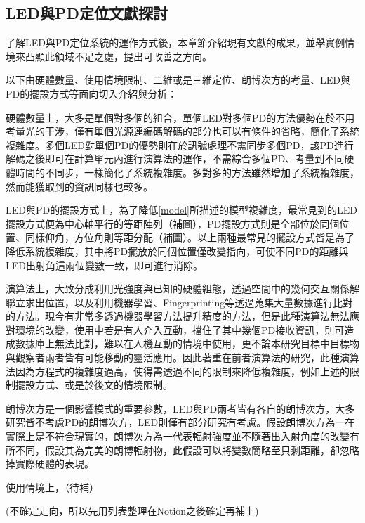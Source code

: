     \subsection{LED與PD定位文獻探討}

        了解LED與PD定位系統的運作方式後，本章節介紹現有文獻的成果，並舉實例情境來凸顯此領域不足之處，提出可改善之方向。

        以下由硬體數量、使用情境限制、二維或是三維定位、朗博次方的考量、LED與PD的擺設方式等面向切入介紹與分析：

        硬體數量上，大多是單個對多個的組合，單個LED對多個PD的方法\cite{case:cart2d}\cite{case:cart3d}\cite{case:3d_layers}優勢在於不用考量光的干涉，僅有單個光源連編碼解碼的部分也可以有條件的省略，簡化了系統複雜度。多個LED對單個PD的優勢則在於訊號處理不需同步多個PD，該PD進行解碼之後即可在計算單元內進行演算法的運作，不需綜合多個PD、考量到不同硬體時間的不同步，一樣簡化了系統複雜度。多對多的方法\cite{case:ml}雖然增加了系統複雜度，然而能獲取到的資訊同樣也較多。

        LED與PD的擺設方式上，為了降低\ref{model}所描述的模型複雜度，最常見到的LED擺設方式便為中心軸平行的等距陣列（補圖），PD擺設方式則是全部位於同個位置、同樣仰角，方位角則等距分配（補圖）\cite{case:cart2d}\cite{case:cart3d}\cite{case:3d_layers}。以上兩種最常見的擺設方式皆是為了降低系統複雜度，其中將PD擺放於同個位置僅改變指向，可使不同PD的距離與LED出射角這兩個變數一致，即可進行消除。
        
        演算法上，大致分成利用光強度與已知的硬體組態，透過空間中的幾何交互關係解聯立求出位置，以及利用機器學習、Fingerprinting等透過蒐集大量數據進行比對的方法。現今有非常多透過機器學習方法提升精度的方法，但是此種演算法無法應對環境的改變，使用中若是有人介入互動，擋住了其中幾個PD接收資訊，則可造成數據庫上無法比對，難以在人機互動的情境中使用，更不論本研究目標中目標物與觀察者兩者皆有可能移動的靈活應用。因此著重在前者演算法的研究，此種演算法因為方程式的複雜度過高，使得需透過不同的限制來降低複雜度，例如上述的限制擺設方式、或是於後文的情境限制。
        
        朗博次方是一個影響模式的重要參數，LED與PD兩者皆有各自的朗博次方，大多研究皆不考慮PD的朗博次方，LED則僅有部分研究有考慮\cite{case:cart2d}\cite{case:cart3d}。假設朗博次方為一在實際上是不符合現實的，朗博次方為一代表輻射強度並不隨著出入射角度的改變有所不同，假設其為完美的朗博輻射物，此假設可以將變數簡略至只剩距離，卻忽略掉實際硬體的表現。

        使用情境上，（待補）
        
        (不確定走向，所以先用列表整理在Notion之後確定再補上)

